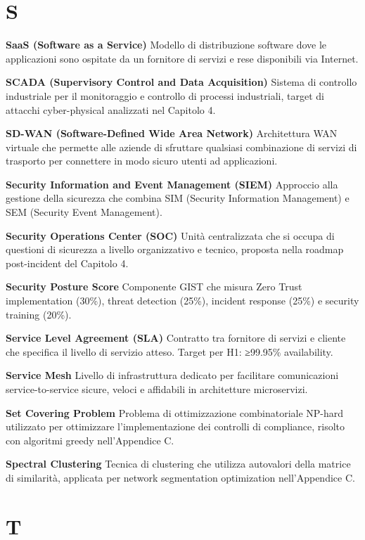 \documentclass[12pt,a4paper,oneside]{book}
\numberwithin{figure}{chapter} %
\numberwithin{table}{chapter}  %
\begin{document}
\section{S}\label{s}

\textbf{SaaS (Software as a Service)} Modello di distribuzione software
dove le applicazioni sono ospitate da un fornitore di servizi e rese
disponibili via Internet.

\textbf{SCADA (Supervisory Control and Data Acquisition)} Sistema di
controllo industriale per il monitoraggio e controllo di processi
industriali, target di attacchi cyber-physical analizzati nel Capitolo
4.

\textbf{SD-WAN (Software-Defined Wide Area Network)} Architettura WAN
virtuale che permette alle aziende di sfruttare qualsiasi combinazione
di servizi di trasporto per connettere in modo sicuro utenti ad
applicazioni.

\textbf{Security Information and Event Management (SIEM)} Approccio alla
gestione della sicurezza che combina SIM (Security Information
Management) e SEM (Security Event Management).

\textbf{Security Operations Center (SOC)} Unità centralizzata che si
occupa di questioni di sicurezza a livello organizzativo e tecnico,
proposta nella roadmap post-incident del Capitolo 4.

\textbf{Security Posture Score} Componente GIST che misura Zero Trust
implementation (30\%), threat detection (25\%), incident response (25\%)
e security training (20\%).

\textbf{Service Level Agreement (SLA)} Contratto tra fornitore di
servizi e cliente che specifica il livello di servizio atteso. Target
per H1: ≥99.95\% availability.

\textbf{Service Mesh} Livello di infrastruttura dedicato per facilitare
comunicazioni service-to-service sicure, veloci e affidabili in
architetture microservizi.

\textbf{Set Covering Problem} Problema di ottimizzazione combinatoriale
NP-hard utilizzato per ottimizzare l'implementazione dei controlli di
compliance, risolto con algoritmi greedy nell'Appendice C.

\textbf{Spectral Clustering} Tecnica di clustering che utilizza
autovalori della matrice di similarità, applicata per network
segmentation optimization nell'Appendice C.

\section{T}\label{t}
\end{document}
